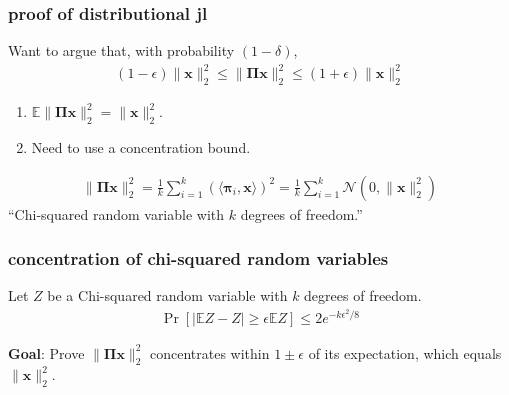 \documentclass[compress,handout]{beamer}
\newcommand{\bs}[1]{\boldsymbol{#1}}
\newcommand{\bv}[1]{\mathbf{#1}}
\newcommand{\E}{\mathbb{E}}
\begin{document}
\begin{frame}
	\frametitle{proof of distributional jl}
	Want to argue that, with probability $(1-\delta)$,
	\begin{align*}
		(1-\epsilon)\|\bv{x}\|_2^2 \leq \|\bs{\Pi}\bv{x}\|_2^2 \leq (1+\epsilon)\|\bv{x}\|_2^2 
	\end{align*}
	
	\begin{enumerate}
		\item $\E \|\bs{\Pi} \bv{x} \|_2^2 = \|\bv{x}\|_2^2$.
		\item Need to use a concentration bound.
	\end{enumerate}
	\begin{align*}
		\|\bs{\Pi} \bv{x} \|_2^2 = \frac{1}{k}\sum_{i=1}^k \left(\langle\bs{\pi}_i,\bv{x}\rangle\right)^2 = \frac{1}{k}\sum_{i=1}^k \mathcal{N}(0,\|\bv{x}\|_2^2)
	\end{align*}
\alert{``Chi-squared random variable with $k$ degrees of freedom.''}
\end{frame}

\begin{frame}[t]
	\frametitle{concentration of chi-squared random variables}
	\begin{lemma} Let $Z$ be a Chi-squared random variable with $k$ degrees of freedom. 
		\begin{align*}
		\Pr[|\E Z - Z| \geq \epsilon \E Z] \leq 2 e^{-k\epsilon^2/8}
		\end{align*}
	\end{lemma}

\vspace{8em}
	\begin{block}{\vspace*{-3ex}}
	\small \textbf{Goal}: Prove $\|\bs{\Pi} \bv{x} \|_2^2$ concentrates within $1 \pm \epsilon$ of its expectation, which equals $\|\bv{x} \|_2^2$.
\end{block}
\end{frame}
\end{document}
